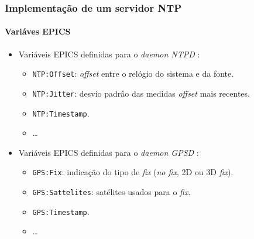 
\begin{frame}

\frametitle{Implementação de um servidor NTP}
\framesubtitle{Variáves EPICS}

\begin{itemize}
  \item Variáveis EPICS definidas para o \textit{daemon NTPD} :

	\begin{itemize}
	\item \texttt{NTP:Offset}: \textit{offset} entre o
	relógio do sistema e da fonte.
	\item \texttt{NTP:Jitter}: desvio padrão das medidas
	\textit{offset} mais recentes.
	\item \texttt{NTP:Timestamp}.
	\item \ldots
	\end{itemize}
  \item Variáveis EPICS definidas para o \textit{daemon GPSD} :
  
	\begin{itemize}
	\item \texttt{GPS:Fix}: indicação do tipo de
	\textit{fix} (\textit{no fix}, 2D ou 3D \textit{fix}).
	\item \texttt{GPS:Sattelites}: satélites usados para o \textit{fix}.
	\item \texttt{GPS:Timestamp}.
	\item \ldots
	\end{itemize}
\end{itemize}
\end{frame}

